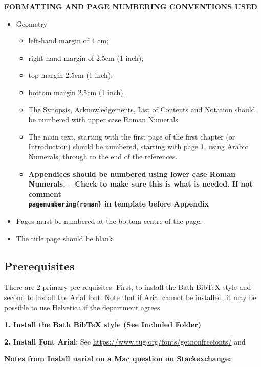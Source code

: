 \textbf{FORMATTING AND PAGE NUMBERING CONVENTIONS USED}

\begin{itemize}
	\item Geometry
	\begin{itemize}
		\item left-hand margin of 4 cm;
		\item right-hand margin of 2.5cm (1 inch);
		\item top margin 2.5cm (1 inch);
		\item bottom margin 2.5cm (1 inch).
	\end{itemize}
	\begin{itemize}
		\item The Synopsis, Acknowledgements, List of Contents and Notation should be numbered with upper case Roman Numerals.
		\item The main text, starting with the first page of the first chapter (or Introduction) should be numbered, starting with page 1, using Arabic Numerals, through to the end of the references.
		\item \textbf{Appendices should be numbered using lower case Roman Numerals. -- Check to make sure this is what is needed. If not comment \texttt{\\pagenumbering\{roman\}} in template before Appendix}
	\end{itemize}
	\item Pages must be numbered at the bottom centre of the page.
	\item The title page should be blank.
\end{itemize}

\subsection{Prerequisites}

There are 2 primary pre-requisites: First, to install the Bath BibTeX style and second to install the Arial font. Note that if Arial cannot be installed, it may be possible to use Helvetica if the department agrees 

\textbf{1. Install the Bath BibTeX style (See Included Folder)}

\textbf{2. Install Font Arial}: See \hyperlink{https://www.tug.org/fonts/getnonfreefonts/}{https://www.tug.org/fonts/getnonfreefonts/} and 

\textbf{Notes from \hyperlink{https://tex.stackexchange.com/questions/37120/how-can-i-install-uarial-sty-on-a-mac}{Install uarial on a Mac} question on Stackexchange: }

